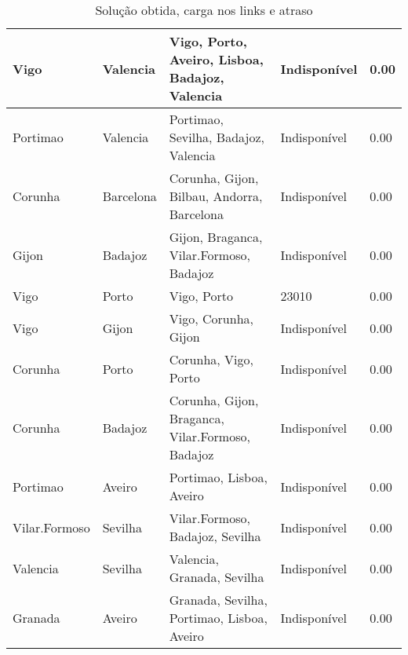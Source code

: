 \begin{table}[!htb]
{\begin{tabular}{|l|l|l|l|l|}
Vigo & Valencia & Vigo, Porto, Aveiro, Lisboa, Badajoz, Valencia & Indisponível & 0.00 \\ \hline
Portimao & Valencia & Portimao, Sevilha, Badajoz, Valencia & Indisponível & 0.00 \\ \hline
Corunha & Barcelona & Corunha, Gijon, Bilbau, Andorra, Barcelona & Indisponível & 0.00 \\ \hline
Gijon & Badajoz & Gijon, Braganca, Vilar.Formoso, Badajoz & Indisponível & 0.00 \\ \hline
Vigo & Porto & Vigo, Porto & 23010 & 0.00 \\ \hline
Vigo & Gijon & Vigo, Corunha, Gijon & Indisponível & 0.00 \\ \hline
Corunha & Porto & Corunha, Vigo, Porto & Indisponível & 0.00 \\ \hline
Corunha & Badajoz & Corunha, Gijon, Braganca, Vilar.Formoso, Badajoz & Indisponível & 0.00 \\ \hline
Portimao & Aveiro & Portimao, Lisboa, Aveiro & Indisponível & 0.00 \\ \hline
Vilar.Formoso & Sevilha & Vilar.Formoso, Badajoz, Sevilha & Indisponível & 0.00 \\ \hline
Valencia & Sevilha & Valencia, Granada, Sevilha & Indisponível & 0.00 \\ \hline
Granada & Aveiro & Granada, Sevilha, Portimao, Lisboa, Aveiro & Indisponível & 0.00 \\ \hline
\end{tabular}}
\caption[]{Solução obtida, carga nos links e atraso}
\end{table}

